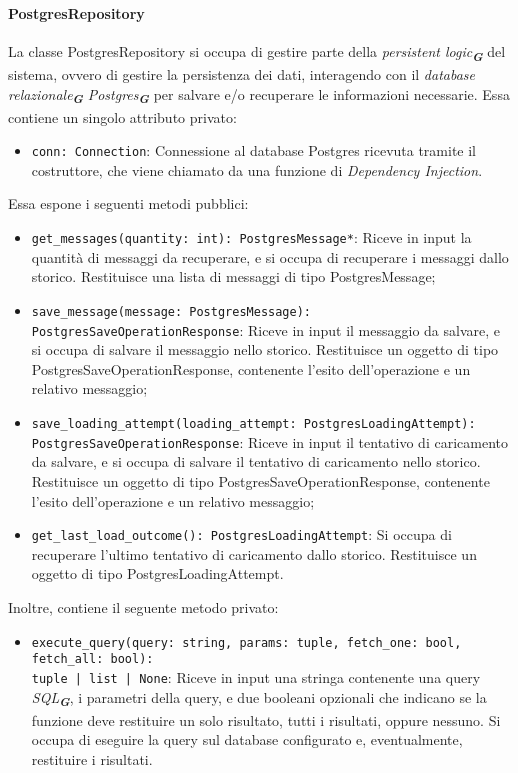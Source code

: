 \paragraph{PostgresRepository}
\label{sec:postgres_repository}
La classe PostgresRepository si occupa di gestire parte della \emph{persistent logic}\textsubscript{\textbf{\textit{G}}} del sistema, ovvero di gestire la persistenza dei dati, interagendo con il \emph{database relazionale}\textsubscript{\textbf{\textit{G}}} \emph{Postgres}\textsubscript{\textbf{\textit{G}}} per salvare e/o recuperare le informazioni necessarie. 
Essa contiene un singolo attributo privato:
\begin{itemize}
    \item \texttt{conn: Connection}: Connessione al database Postgres ricevuta tramite il costruttore, che viene chiamato da una funzione di \emph{Dependency Injection}.
\end{itemize}
Essa espone i seguenti metodi pubblici:
\begin{itemize}
    \item \texttt{get\_messages(quantity: int): PostgresMessage*}: Riceve in input la quantità di messaggi da recuperare, e si occupa di recuperare i messaggi dallo storico. Restituisce una lista di messaggi di tipo PostgresMessage;
    \item \texttt{save\_message(message: PostgresMessage): PostgresSaveOperationResponse}: Riceve in input il messaggio da salvare, e si occupa di salvare il messaggio nello storico. Restituisce un oggetto di tipo PostgresSaveOperationResponse, contenente l'esito dell'operazione e un relativo messaggio;
    \item \texttt{save\_loading\_attempt(loading\_attempt: PostgresLoadingAttempt):\\ PostgresSaveOperationResponse}: Riceve in input il tentativo di caricamento da salvare, e si occupa di salvare il tentativo di caricamento nello storico. Restituisce un oggetto di tipo PostgresSaveOperationResponse, contenente l'esito dell'operazione e un relativo messaggio;
    \item \texttt{get\_last\_load\_outcome(): PostgresLoadingAttempt}: Si occupa di recuperare l'ultimo tentativo di caricamento dallo storico. Restituisce un oggetto di tipo PostgresLoadingAttempt.
\end{itemize}
Inoltre, contiene il seguente metodo privato:
\begin{itemize}
    \item \texttt{execute\_query(query: string, params: tuple, fetch\_one: bool, fetch\_all: bool):\\ tuple | list | None}: Riceve in input una stringa contenente una query \emph{SQL}\textsubscript{\textbf{\textit{G}}}, i parametri della query, e due booleani opzionali che indicano se la funzione deve restituire un solo risultato, tutti i risultati, oppure nessuno. Si occupa di eseguire la query sul database configurato e, eventualmente, restituire i risultati.
\end{itemize}

